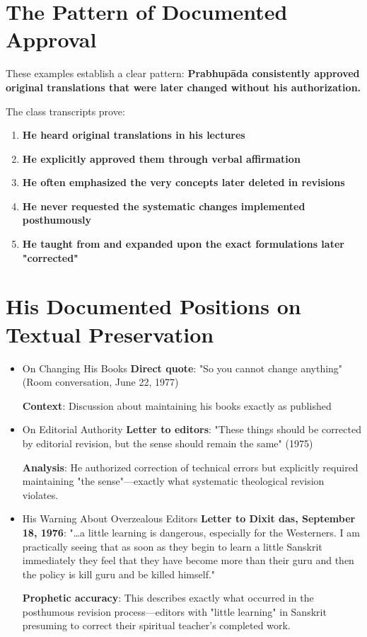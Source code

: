 \documentclass[11pt,twoside]{book}
\begin{document}
\section*{The Pattern of Documented Approval}
\label{sec:orgf275456}

These examples establish a clear pattern: \textbf{\textbf{Prabhupāda consistently approved original translations that were later changed without his authorization.}}

The class transcripts prove:
\begin{enumerate}
\item \textbf{\textbf{He heard original translations in his lectures}}
\item \textbf{\textbf{He explicitly approved them through verbal affirmation}}
\item \textbf{\textbf{He often emphasized the very concepts later deleted in revisions}}
\item \textbf{\textbf{He never requested the systematic changes implemented posthumously}}
\item \textbf{\textbf{He taught from and expanded upon the exact formulations later "corrected"}}
\end{enumerate}
\section*{His Documented Positions on Textual Preservation}
\label{sec:org35ef2ad}

\begin{itemize}
\item On Changing His Books
\label{sec:org26ba6b6}
\textbf{\textbf{Direct quote}}: "So you cannot change anything" (Room conversation, June 22, 1977)

\textbf{\textbf{Context}}: Discussion about maintaining his books exactly as published
\item On Editorial Authority
\label{sec:org2f51bd9}
\textbf{\textbf{Letter to editors}}: "These things should be corrected by editorial revision, but the sense should remain the same" (1975)

\textbf{\textbf{Analysis}}: He authorized correction of technical errors but explicitly required maintaining "the sense"—exactly what systematic theological revision violates.
\item His Warning About Overzealous Editors
\label{sec:orgf0fe13d}
\textbf{\textbf{Letter to Dixit das, September 18, 1976}}: "\ldots{}a little learning is dangerous, especially for the Westerners. I am practically seeing that as soon as they begin to learn a little Sanskrit immediately they feel that they have become more than their guru and then the policy is kill guru and be killed himself."

\textbf{\textbf{Prophetic accuracy}}: This describes exactly what occurred in the posthumous revision process—editors with "little learning" in Sanskrit presuming to correct their spiritual teacher's completed work.
\end{itemize}
\end{document}

